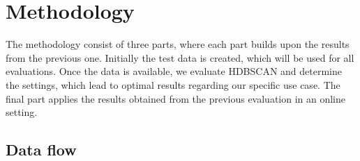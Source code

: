 \section{Methodology}

The methodology consist of three parts, where each part builds upon the results from the previous one.
Initially the test data is created, which will be used for all evaluations.
Once the data is available, we evaluate HDBSCAN and determine the settings,
which lead to optimal results regarding our specific use case.
The final part applies the results obtained from the previous evaluation in an online setting.

\subsection{Data flow}




